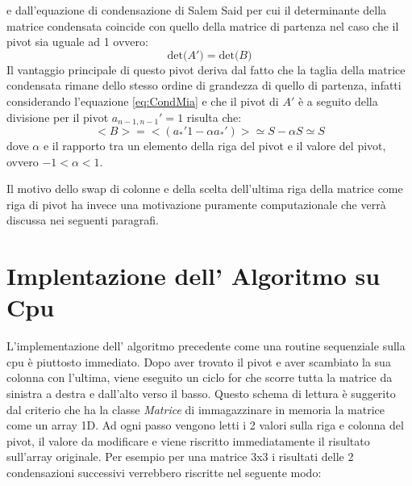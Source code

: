 \documentclass{article}
\begin{document}
e dall'equazione di condensazione di Salem Said per cui il determinante della matrice condensata coincide con quello della matrice di partenza nel caso che il pivot sia uguale ad 1 ovvero:
\begin{displaymath}
\mbox{det}\big(A'\big) = \mbox{det}\big(B\big)
\end{displaymath}
\newline
Il vantaggio principale di questo pivot deriva dal fatto che la taglia della matrice condensata rimane dello stesso ordine di grandezza di quello di partenza, infatti considerando l'equazione \ref{eq:CondMia} e che il pivot di $A'$ è  a seguito della divisione per il pivot $ a_{n-1,n-1}'=1$ risulta che:
\begin{displaymath}
<B> = <(a_{\ast}' 1 -\alpha a_{\ast}')>  \simeq S - \alpha S \simeq S
\end{displaymath}
dove $\alpha$ e il rapporto tra un elemento della riga del pivot e il valore del pivot, ovvero $-1<\alpha < 1$.

Il motivo dello swap di colonne e della scelta dell'ultima riga della matrice come riga di pivot ha invece una motivazione puramente computazionale che verrà discussa nei seguenti paragrafi.

\section{Implentazione dell' Algoritmo su Cpu}
L'implementazione dell' algoritmo precedente come una routine sequenziale sulla cpu è piuttosto immediato.
Dopo aver trovato il pivot e aver scambiato la sua colonna con l'ultima,  viene eseguito un ciclo for che scorre tutta la matrice da sinistra a destra e dall'alto verso il basso. 
Questo schema di lettura è suggerito dal criterio che ha la classe \textit{Matrice} di immagazzinare in memoria la matrice come un array 1D.
Ad ogni passo vengono letti i 2 valori sulla riga e colonna del pivot, il valore da modificare e viene riscritto immediatamente il risultato sull'array originale.
Per esempio per una matrice 3x3 i risultati delle 2 condensazioni successivi verrebbero riscritte nel seguente modo:
\end{document}
